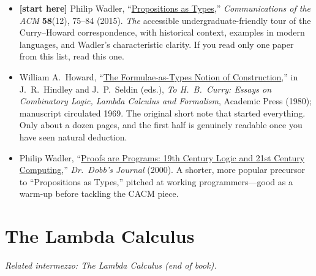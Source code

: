 \documentclass[11pt]{article}
\begin{document}
\begin{itemize}
  \item \textbf{[start here]} Philip Wadler, ``\href{https://homepages.inf.ed.ac.uk/wadler/papers/propositions-as-types/propositions-as-types.pdf}{Propositions as Types},'' \emph{Communications of the ACM} \textbf{58}(12), 75--84 (2015). \emph{The} accessible undergraduate-friendly tour of the Curry--Howard correspondence, with historical context, examples in modern languages, and Wadler's characteristic clarity. If you read only one paper from this list, read this one.
  \item William A.\ Howard, ``\href{https://www.cs.cmu.edu/~crary/819-f09/Howard80.pdf}{The Formulae-as-Types Notion of Construction},'' in J.\ R.\ Hindley and J.\ P.\ Seldin (eds.), \emph{To H.\ B.\ Curry: Essays on Combinatory Logic, Lambda Calculus and Formalism}, Academic Press (1980); manuscript circulated 1969. The original short note that started everything. Only about a dozen pages, and the first half is genuinely readable once you have seen natural deduction.
  \item Philip Wadler, ``\href{https://homepages.inf.ed.ac.uk/wadler/papers/frege/frege.pdf}{Proofs are Programs: 19th Century Logic and 21st Century Computing},'' \emph{Dr.\ Dobb's Journal} (2000). A shorter, more popular precursor to ``Propositions as Types,'' pitched at working programmers---good as a warm-up before tackling the CACM piece.
\end{itemize}

\section*{The Lambda Calculus}
\emph{Related intermezzo: The Lambda Calculus (end of book).}
\end{document}
